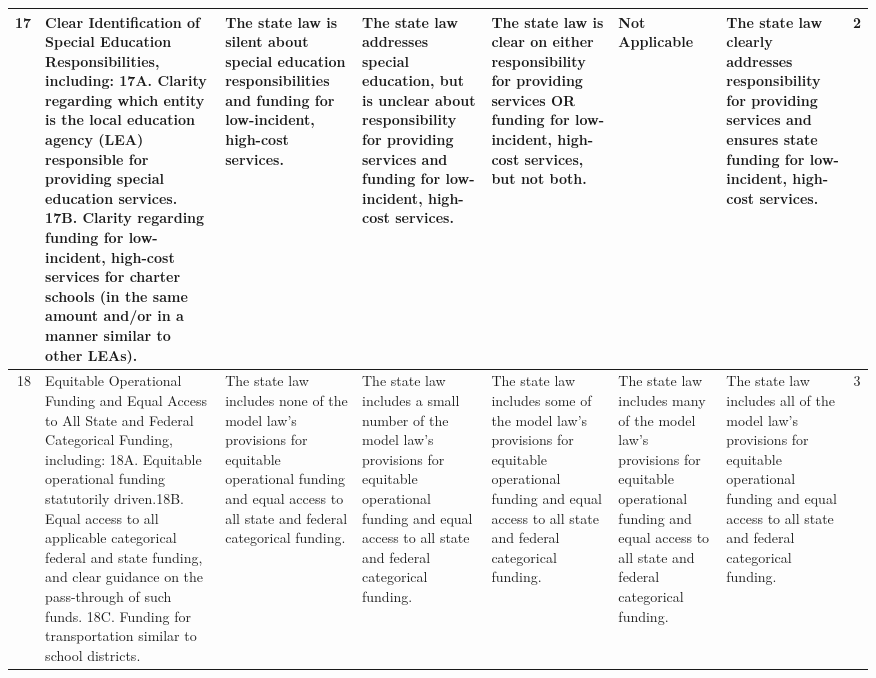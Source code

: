 {\begin{longtable}{rp{2.2in}p{0.9in}p{0.9in}p{0.9in}p{0.9in}p{0.9in}c}
   \hline
 17 & Clear Identification of Special Education Responsibilities, including: 17A. Clarity regarding which entity is the local education agency (LEA) responsible for providing special education services. 17B. Clarity regarding funding for low-incident, high-cost services for charter schools (in the same amount and/or in a manner similar to other LEAs).  & The state law is silent about special education responsibilities and funding for low-incident, high-cost services.  & The state law addresses special education, but is unclear about responsibility for providing services and funding for low-incident, high-cost services.  & The state law is clear on either responsibility for providing services OR funding for low-incident, high-cost services, but not both.  & Not Applicable  & The state law clearly addresses responsibility for providing services and ensures state funding for low-incident, high-cost services.  &   2 \\ 
   \hline
 18 & Equitable Operational Funding and Equal Access to All State and Federal Categorical Funding, including: 18A. Equitable operational funding statutorily driven.18B. Equal access to all applicable categorical federal and state funding, and clear guidance on the pass-through of such funds. 18C. Funding for transportation similar to school districts.  & The state law includes none of the model law’s provisions for equitable operational funding and equal access to all state and federal categorical funding.  & The state law includes a small number of the model law’s provisions for equitable operational funding and equal access to all state and federal categorical funding.  & The state law includes some of the model law’s provisions for equitable operational funding and equal access to all state and federal categorical funding.  & The state law includes many of the model law’s provisions for equitable operational funding and equal access to all state and federal categorical funding.  & The state law includes all of the model law’s provisions for equitable operational funding and equal access to all state and federal categorical funding.  &   3 \\ 
   \hline

\end{longtable}}
